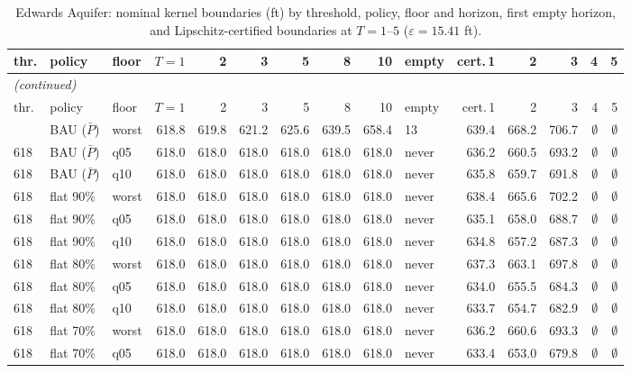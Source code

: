\begingroup\scriptsize\setlength{\tabcolsep}{2.5pt}
\begin{longtable}{lllrrrrrrlrrrrr}
\caption{Edwards Aquifer: nominal kernel boundaries (ft) by threshold, policy, floor and horizon, first empty horizon, and Lipschitz-certified boundaries at $T=1$--$5$ ($\varepsilon=15.41$ ft).}\label{tab:si-edw-kernels}\\
\toprule
thr. & policy & floor & $T{=}1$ & 2 & 3 & 5 & 8 & 10 & empty & cert.\,1 & 2 & 3 & 4 & 5 \\
\midrule
\endfirsthead
\multicolumn{15}{l}{\emph{(continued)}}\\
\toprule
thr. & policy & floor & $T{=}1$ & 2 & 3 & 5 & 8 & 10 & empty & cert.\,1 & 2 & 3 & 4 & 5 \\
\midrule
\endhead
\bottomrule
\endfoot
618 & BAU ($\bar P$) & worst & 618.8 & 619.8 & 621.2 & 625.6 & 639.5 & 658.4 & 13 & 639.4 & 668.2 & 706.7 & $\emptyset$ & $\emptyset$ \\
618 & BAU ($\bar P$) & q05 & 618.0 & 618.0 & 618.0 & 618.0 & 618.0 & 618.0 & never & 636.2 & 660.5 & 693.2 & $\emptyset$ & $\emptyset$ \\
618 & BAU ($\bar P$) & q10 & 618.0 & 618.0 & 618.0 & 618.0 & 618.0 & 618.0 & never & 635.8 & 659.7 & 691.8 & $\emptyset$ & $\emptyset$ \\
618 & flat 90\% & worst & 618.0 & 618.0 & 618.0 & 618.0 & 618.0 & 618.0 & never & 638.4 & 665.6 & 702.2 & $\emptyset$ & $\emptyset$ \\
618 & flat 90\% & q05 & 618.0 & 618.0 & 618.0 & 618.0 & 618.0 & 618.0 & never & 635.1 & 658.0 & 688.7 & $\emptyset$ & $\emptyset$ \\
618 & flat 90\% & q10 & 618.0 & 618.0 & 618.0 & 618.0 & 618.0 & 618.0 & never & 634.8 & 657.2 & 687.3 & $\emptyset$ & $\emptyset$ \\
618 & flat 80\% & worst & 618.0 & 618.0 & 618.0 & 618.0 & 618.0 & 618.0 & never & 637.3 & 663.1 & 697.8 & $\emptyset$ & $\emptyset$ \\
618 & flat 80\% & q05 & 618.0 & 618.0 & 618.0 & 618.0 & 618.0 & 618.0 & never & 634.0 & 655.5 & 684.3 & $\emptyset$ & $\emptyset$ \\
618 & flat 80\% & q10 & 618.0 & 618.0 & 618.0 & 618.0 & 618.0 & 618.0 & never & 633.7 & 654.7 & 682.9 & $\emptyset$ & $\emptyset$ \\
618 & flat 70\% & worst & 618.0 & 618.0 & 618.0 & 618.0 & 618.0 & 618.0 & never & 636.2 & 660.6 & 693.3 & $\emptyset$ & $\emptyset$ \\
618 & flat 70\% & q05 & 618.0 & 618.0 & 618.0 & 618.0 & 618.0 & 618.0 & never & 633.4 & 653.0 & 679.8 & $\emptyset$ & $\emptyset$ \\

\end{longtable}
